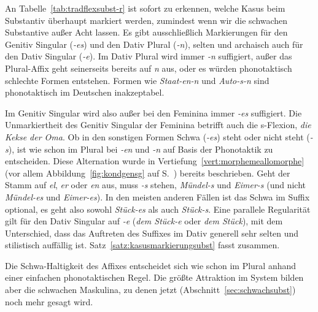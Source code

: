 An Tabelle~\ref{tab:tradflexsubst-r} ist sofort zu erkennen, welche Kasus beim Substantiv überhaupt markiert werden, zumindest wenn wir die schwachen Substantive außer Acht lassen.
Es gibt ausschließlich Markierungen für den Genitiv Singular (\textit{-es}) und den Dativ Plural (\textit{-n}), selten und archaisch auch für den Dativ Singular (\textit{-e}).
Im Dativ Plural wird immer \textit{-n} suffigiert, außer das Plural-Affix geht seinerseits bereits auf \textit{n} aus, oder es würden phonotaktisch schlechte Formen entstehen.
Formen wie \textit{\Ast Staat-en-n} und \textit{\Ast Auto-s-n} sind phonotaktisch im Deutschen inakzeptabel.

Im Genitiv Singular wird also außer bei den Feminina immer \textit{-es} suffigiert.
Die Unmarkiertheit des Genitiv Singular der Feminina betrifft auch die s-Flexion, \zB \textit{die Kekse der Oma}.
Ob in den sonstigen Formen Schwa (\textit{-es}) steht oder nicht steht (\textit{-s}), ist wie schon im Plural bei \textit{-en} und \textit{-n} auf Basis der Phonotaktik zu entscheiden.
Diese Alternation wurde in Vertiefung~\ref{vert:morphemeallomorphe} (vor allem Abbildung~\ref{fig:kondgensg} auf S.~\pageref{fig:kondgensg}) bereits beschrieben.
Geht der Stamm auf \textit{el}, \textit{er} oder \textit{en} aus, muss \textit{-s} stehen, \zB \textit{Mündel-s} und \textit{Eimer-s} (und nicht \textit{\Ast Mündel-es} und \textit{\Ast Eimer-es}).
In den meisten anderen Fällen ist das Schwa im Suffix optional, es geht also sowohl \textit{Stück-es} als auch \textit{Stück-s}.
Eine parallele Regularität gilt für den Dativ Singular auf \textit{-e} (\textit{dem Stück-e} oder \textit{dem Stück}), mit dem Unterschied, dass das Auftreten des Suffixes im Dativ generell sehr selten und stilistisch auffällig ist.
Satz~\ref{satz:kasusmarkierungsubst} fasst zusammen.




Die Schwa-Haltigkeit des Affixes entscheidet sich wie schon im Plural anhand einer einfachen phonotaktischen Regel.
Die größte Attraktion im System bilden aber die schwachen Maskulina, zu denen jetzt (Abschnitt~\ref{sec:schwachsubst}) noch mehr gesagt wird.


